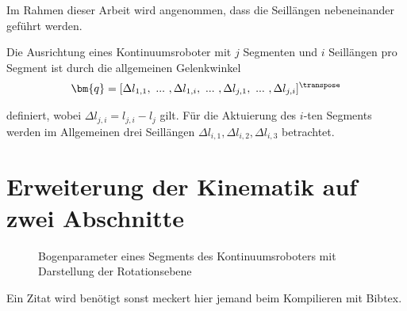 Im Rahmen dieser Arbeit wird angenommen, dass die Seillängen nebeneinander geführt werden. 


Die Ausrichtung eines Kontinuumsroboter mit $j$ Segmenten und $i$ Seillängen pro Segment ist durch die allgemeinen Gelenkwinkel
%
\begin{align*}
\bm{q} = [\Delta l_{1,1},~...~,\Delta l_{1,i},~...~,\Delta l_{j,1},~...~, \Delta l_{j,i} ]^\transpose
\end{align*}

definiert, wobei $\Delta l_{j,i} = l_{j,i}-l_j$ gilt. 
Für die Aktuierung des $i$-ten Segments werden im Allgemeinen drei Seillängen $\Delta l_{i,1}, \Delta l_{i,2}, \Delta l_{i,3}$ betrachtet. 


\section{Erweiterung der Kinematik auf zwei Abschnitte}
\label{sec:erweiterungKinematik}
\lipsum[1]
\begin{wrapfigure}{I}{0.5\textwidth}
\centering
{
   \fontsize{14pt}{11pt}\selectfont%
   
}
%
\caption[Bogenparameter eines Segments des Kontinuumsroboters]{Bogenparameter eines Segments des Kontinuumsroboters mit Darstellung der Rotationsebene}
\end{wrapfigure}

\lipsum[2-3]




\vspace{2cm} Ein Zitat wird benötigt sonst meckert hier jemand \cite{Li17} beim Kompilieren mit Bibtex.
